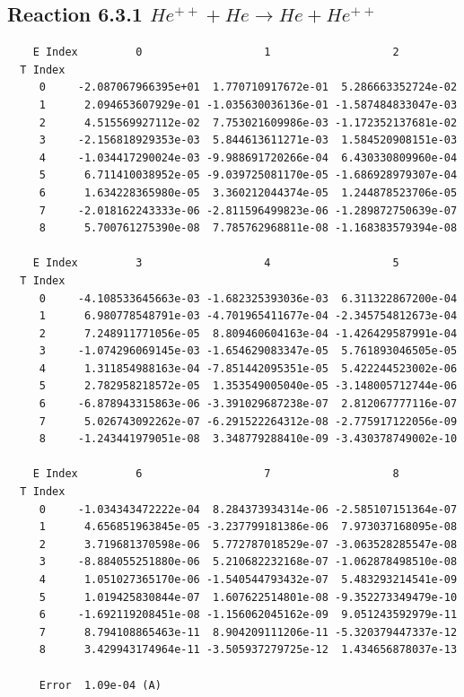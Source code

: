 \documentclass[12pt,dvipdfmx]{article}
\begin{document}
\newpage
\subsection{
Reaction 6.3.1 $   He^{++} + He \rightarrow He + He^{++}$}


\begin{small}\begin{verbatim}
    E Index         0                   1                   2
  T Index
     0     -2.087067966395e+01  1.770710917672e-01  5.286663352724e-02
     1      2.094653607929e-01 -1.035630036136e-01 -1.587484833047e-03
     2      4.515569927112e-02  7.753021609986e-03 -1.172352137681e-02
     3     -2.156818929353e-03  5.844613611271e-03  1.584520908151e-03
     4     -1.034417290024e-03 -9.988691720266e-04  6.430330809960e-04
     5      6.711410038952e-05 -9.039725081170e-05 -1.686928979307e-04
     6      1.634228365980e-05  3.360212044374e-05  1.244878523706e-05
     7     -2.018162243333e-06 -2.811596499823e-06 -1.289872750639e-07
     8      5.700761275390e-08  7.785762968811e-08 -1.168383579394e-08

    E Index         3                   4                   5
  T Index
     0     -4.108533645663e-03 -1.682325393036e-03  6.311322867200e-04
     1      6.980778548791e-03 -4.701965411677e-04 -2.345754812673e-04
     2      7.248911771056e-05  8.809460604163e-04 -1.426429587991e-04
     3     -1.074296069145e-03 -1.654629083347e-05  5.761893046505e-05
     4      1.311854988163e-04 -7.851442095351e-05  5.422244523002e-06
     5      2.782958218572e-05  1.353549005040e-05 -3.148005712744e-06
     6     -6.878943315863e-06 -3.391029687238e-07  2.812067777116e-07
     7      5.026743092262e-07 -6.291522264312e-08 -2.775917122056e-09
     8     -1.243441979051e-08  3.348779288410e-09 -3.430378749002e-10

    E Index         6                   7                   8
  T Index
     0     -1.034343472222e-04  8.284373934314e-06 -2.585107151364e-07
     1      4.656851963845e-05 -3.237799181386e-06  7.973037168095e-08
     2      3.719681370598e-06  5.772787018529e-07 -3.063528285547e-08
     3     -8.884055251880e-06  5.210682232168e-07 -1.062878498510e-08
     4      1.051027365170e-06 -1.540544793432e-07  5.483293214541e-09
     5      1.019425830844e-07  1.607622514801e-08 -9.352273349479e-10
     6     -1.692119208451e-08 -1.156062045162e-09  9.051243592979e-11
     7      8.794108865463e-11  8.904209111206e-11 -5.320379447337e-12
     8      3.429943174964e-11 -3.505937279725e-12  1.434656878037e-13

     Error  1.09e-04 (A)
\end{verbatim}\end{small}
\end{document}
